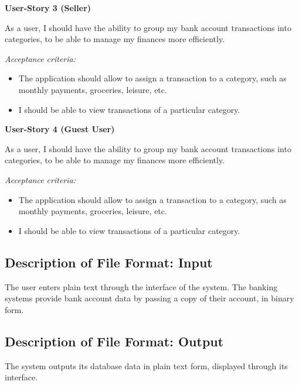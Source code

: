 \documentclass[11pt]{article}
\newcounter{use case ID}
\begin{document}
\textbf{User-Story 3 (Seller)}

As a user, I should have the ability to group my bank account transactions into categories, to be able to manage my finances more efficiently.

\textit{Acceptance criteria:}
\begin{itemize}
    \item The application should allow to assign a transaction to a category, such as monthly payments, groceries, leisure, etc.
    \item I should be able to view transactions of a particular category.
\end{itemize}

\textbf{User-Story 4 (Guest User)}

As a user, I should have the ability to group my bank account transactions into categories, to be able to manage my finances more efficiently.

\textit{Acceptance criteria:}
\begin{itemize}
    \item The application should allow to assign a transaction to a category, such as monthly payments, groceries, leisure, etc.
    \item I should be able to view transactions of a particular category.
\end{itemize}

\subsection{Description of File Format: Input}

The user enters plain text through the interface of the system. The banking systems provide bank account data by passing a copy of their account, in binary form.

\subsection{Description of File Format: Output}

The system outputs its database data in plain text form, displayed through its interface.
\end{document}
